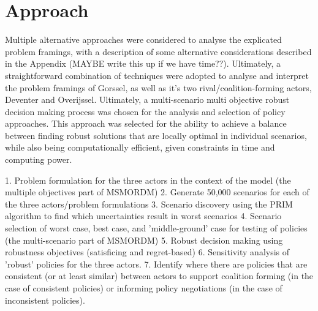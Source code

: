 \section{Approach}
\label{s:approach}


Multiple alternative approaches were considered to analyse the explicated problem framings, with a description of some alternative considerations described in the Appendix (MAYBE write this up if we have time??). Ultimately, a straightforward combination of techniques were adopted to analyse and interpret the problem framings of Gorssel, as well as it's two rival/coalition-forming actors, Deventer and Overijssel. Ultimately, a multi-scenario multi objective robust decision making process was chosen for the analysis and selection of policy approaches. This approach was selected for the ability to achieve a balance between finding robust solutions that are locally optimal in individual scenarios, while also being computationally efficient, given constraints in time and computing power.

1. Problem formulation for the three actors in the context of the model (the multiple objectives part of MSMORDM)
2. Generate 50,000 scenarios for each of the three actors/problem formulations
3. Scenario discovery using the PRIM algorithm to find which uncertainties result in worst scenarios
4. Scenario selection of worst case, best case, and 'middle-ground' case for testing of policies (the multi-scenario part of MSMORDM)
5. Robust decision making using robustness objectives (satisficing and regret-based)
6. Sensitivity analysis of 'robust' policies for the three actors.
7. Identify where there are policies that are consistent (or at least similar) between actors to support coalition forming (in the case of consistent policies) or informing policy negotiations (in the case of inconsistent policies).